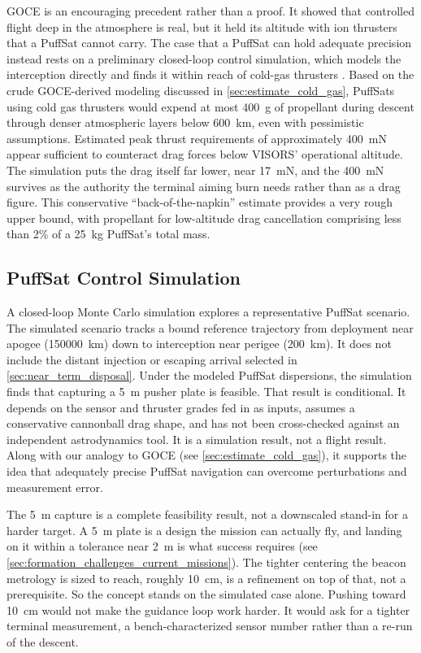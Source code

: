 \documentclass{article}
\begin{document}
GOCE is an encouraging precedent rather than a proof. It showed that controlled flight deep in the atmosphere is real, but it held its altitude with ion thrusters that a PuffSat cannot carry. The case that a PuffSat can hold adequate precision instead rests on a preliminary closed-loop control simulation, which models the interception directly and finds it within reach of cold-gas thrusters \cite{Katz_puffsat_control_sim_2026}. Based on the crude GOCE-derived modeling discussed in \autoref{sec:estimate_cold_gas}, PuffSats using cold gas thrusters would expend at most \SI{400}{\gram} of propellant during descent through denser atmospheric layers below \SI{600}{\kilo\meter}, even with pessimistic assumptions. Estimated peak thrust requirements of approximately \SI{400}{\milli\newton} appear sufficient to counteract drag forces below VISORS' operational altitude. The simulation puts the drag itself far lower, near \SI{17}{\milli\newton}, and the \SI{400}{\milli\newton} survives as the authority the terminal aiming burn needs rather than as a drag figure. This conservative ``back-of-the-napkin'' estimate provides a very rough upper bound, with propellant for low-altitude drag cancellation comprising less than 2\% of a \SI{25}{\kilo\gram} PuffSat's total mass.

\subsection{PuffSat Control Simulation}\label{sec:puffsat_control_simulation}
A closed-loop Monte Carlo simulation \cite{Katz_puffsat_control_sim_2026} explores a representative PuffSat scenario. The simulated scenario tracks a bound reference trajectory from deployment near apogee (\SI{150000}{\kilo\meter}) down to interception near perigee (\SI{200}{\kilo\meter}). It does not include the distant injection or escaping arrival selected in \autoref{sec:near_term_disposal}. Under the modeled PuffSat dispersions, the simulation finds that capturing a \SI{5}{\meter} pusher plate is feasible. That result is conditional. It depends on the sensor and thruster grades fed in as inputs, assumes a conservative cannonball drag shape, and has not been cross-checked against an independent astrodynamics tool. It is a simulation result, not a flight result. Along with our analogy to GOCE (see \autoref{sec:estimate_cold_gas}), it supports the idea that adequately precise PuffSat navigation can overcome perturbations and measurement error.

The \SI{5}{\meter} capture is a complete feasibility result, not a downscaled stand-in for a harder target. A \SI{5}{\meter} plate is a design the mission can actually fly, and landing on it within a tolerance near \SI{2}{\meter} is what success requires (see \autoref{sec:formation_challenges_current_missions}). The tighter centering the beacon metrology is sized to reach, roughly \SI{10}{\centi\meter}, is a refinement on top of that, not a prerequisite. So the concept stands on the simulated case alone. Pushing toward \SI{10}{\centi\meter} would not make the guidance loop work harder. It would ask for a tighter terminal measurement, a bench-characterized sensor number rather than a re-run of the descent.
\end{document}
